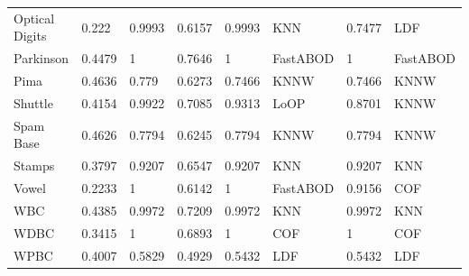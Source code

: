 \begin{table}[ht!]
\begin{tabular}{@{}llllllll@{}}
\multicolumn{1}{l|}{Optical Digits}        &   0.222  &   0.9993  & \multicolumn{1}{l|}{0.6157}    &     0.9993     & \multicolumn{1}{l|}{KNN}         &            0.7477        &     LDF               \\
\multicolumn{1}{l|}{Parkinson}        &  0.4479   &   1  & \multicolumn{1}{l|}{0.7646}    &     1     & \multicolumn{1}{l|}{FastABOD}         &         1           &          FastABOD          \\
\multicolumn{1}{l|}{Pima}        &   0.4636   &   0.779  & \multicolumn{1}{l|}{ 0.6273}    &     0.7466     & \multicolumn{1}{l|}{KNNW}         &         0.7466           &     KNNW               \\
\multicolumn{1}{l|}{Shuttle}        &   0.4154  &   0.9922  & \multicolumn{1}{l|}{0.7085}    &     0.9313     & \multicolumn{1}{l|}{LoOP}         &        0.8701            &     KNNW               \\
\multicolumn{1}{l|}{Spam Base}        &  0.4626   &  0.7794  & \multicolumn{1}{l|}{0.6245}    &   0.7794       & \multicolumn{1}{l|}{KNNW}         &         0.7794           &        KNNW            \\
\multicolumn{1}{l|}{Stamps}        &  0.3797   &   0.9207  & \multicolumn{1}{l|}{0.6547}    &   0.9207       & \multicolumn{1}{l|}{KNN}         &         0.9207           &        KNN            \\
\multicolumn{1}{l|}{Vowel}        &  0.2233   &   1  & \multicolumn{1}{l|}{0.6142}    &       1   & \multicolumn{1}{l|}{FastABOD}         &            0.9156        &               COF     \\
\multicolumn{1}{l|}{WBC}        &   0.4385  &   0.9972  & \multicolumn{1}{l|}{0.7209}    &   0.9972       & \multicolumn{1}{l|}{KNN}         &        0.9972            &      KNN              \\
\multicolumn{1}{l|}{WDBC}        &   0.3415  &   1  & \multicolumn{1}{l|}{0.6893}    &      1    & \multicolumn{1}{l|}{COF}         &          1          &       COF             \\
\multicolumn{1}{l|}{WPBC}        &   0.4007  &  0.5829   & \multicolumn{1}{l|}{0.4929}    &      0.5432    & \multicolumn{1}{l|}{LDF}         &            0.5432        &       LDF             \\ \bottomrule
\end{tabular}
\end{table}

